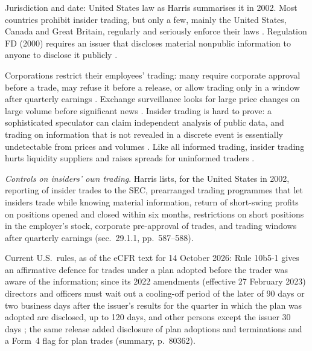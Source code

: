 \begin{qfdefinition}
 Jurisdiction and date: United States law as Harris summarises it in 2002. Most countries prohibit insider trading, but only a few, mainly the United States, Canada and Great Britain, regularly and seriously enforce their laws \citep[chap.~``Insider Trading'', p.~584]{alpha-harris}. Regulation FD (2000) requires an issuer that discloses material nonpublic information to anyone to disclose it publicly \citep[same chap., box, p.~586]{alpha-harris}.

 Corporations restrict their employees' trading: many require corporate approval before a trade, may refuse it before a release, or allow trading only in a window after quarterly earnings \citep[same chap., sec.~29.1.1, p.~588]{alpha-harris}. Exchange surveillance looks for large price changes on large volume before significant news \citep[same chap., sec.~29.2, p.~588]{alpha-harris}. Insider trading is hard to prove: a sophisticated speculator can claim independent analysis of public data, and trading on information that is not revealed in a discrete event is essentially undetectable from prices and volumes \citep[same chap., pp.~589--590]{alpha-harris}. Like all informed trading, insider trading hurts liquidity suppliers and raises spreads for uninformed traders \citep[same chap., sec.~29.3.1.2, pp.~591--592]{alpha-harris}.

\emph{Controls on insiders' own trading}. Harris lists, for the United States in 2002, reporting of insider trades to the SEC, prearranged trading programmes that let insiders trade while knowing material information, return of short-swing profits on positions opened and closed within six months, restrictions on short positions in the employer's stock, corporate pre-approval of trades, and trading windows after quarterly earnings (sec.~29.1.1, pp.~587--588).

Current U.S.\ rules, as of the eCFR text for 14 October 2026: Rule 10b5-1 gives an affirmative defence for trades under a plan adopted before the trader was aware of the information; since its 2022 amendments (effective 27 February 2023) directors and officers must wait out a cooling-off period of the later of 90 days or two business days after the issuer's results for the quarter in which the plan was adopted are disclosed, up to 120 days, and other persons except the issuer 30 days \citep[paras.~(b) and (c)(1)(ii)(B)]{cfr-240-10b5-1} \citep[summary and dates, p.~80362]{sec-34-96492}; the same release added disclosure of plan adoptions and terminations and a Form~4 flag for plan trades (summary, p.~80362).


\end{qfdefinition}
